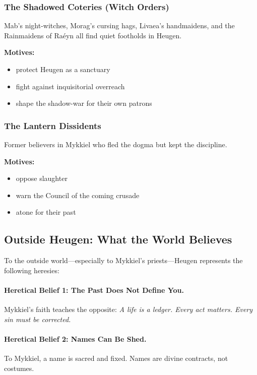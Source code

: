 \documentclass[11pt]{book}
\begin{document}
\subsubsection{The Shadowed Coteries (Witch Orders)}
Mab's night-witches, Morag's cursing hags, Livaea's handmaidens,  
and the Rainmaidens of Raéyn all find quiet footholds in Heugen.  

\textbf{Motives:}  
\begin{itemize}[leftmargin=*]
    \item protect Heugen as a sanctuary  
    \item fight against inquisitorial overreach  
    \item shape the shadow-war for their own patrons  
\end{itemize}

\subsubsection{The Lantern Dissidents}
Former believers in Mykkiel who fled the dogma but kept the discipline.

\textbf{Motives:}  
\begin{itemize}[leftmargin=*]
    \item oppose slaughter  
    \item warn the Council of the coming crusade  
    \item atone for their past  
\end{itemize}

\subsection{Outside Heugen: What the World Believes}

To the outside world---especially to Mykkiel's priests---Heugen represents the following heresies:

\paragraph{Heretical Belief 1: The Past Does Not Define You.}  
Mykkiel's faith teaches the opposite:  
\emph{A life is a ledger. Every act matters. Every sin must be corrected.}

\paragraph{Heretical Belief 2: Names Can Be Shed.}  
To Mykkiel, a name is sacred and fixed.  
Names are divine contracts, not costumes.
\end{document}
